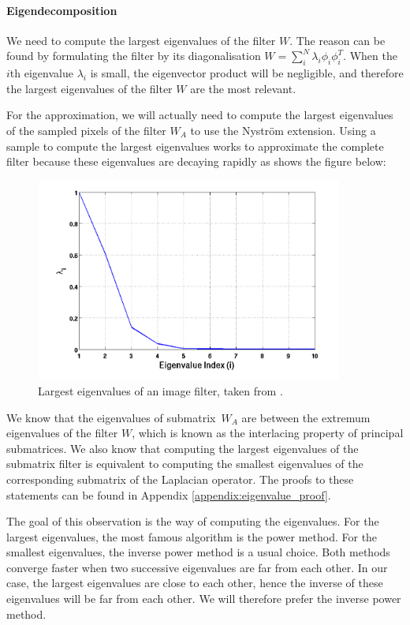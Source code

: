 \paragraph{Eigendecomposition}
We need to compute the largest eigenvalues of the filter \(W\).
The reason can be found by formulating the filter by its diagonalisation \(W = \sum_i^N \lambda_i \phi_i \phi_i^T\).
When the \(i\)th eigenvalue \(\lambda_i\) is small, the eigenvector product will be negligible, and therefore the largest eigenvalues of the filter \(W\) are the most relevant.

For the approximation, we will actually need to compute the largest eigenvalues of the sampled pixels of the filter \(W_A\) to use the Nystr\"om extension.
Using a sample to compute the largest eigenvalues works to approximate the complete filter because these eigenvalues are decaying rapidly as shows the figure below:
\begin{figure}[H]
  \centering
  \includegraphics[width=0.9\textwidth]{img/decayingEigenvalues.png}
  \caption{Largest eigenvalues of an image filter, taken from \cite{siam_slides_2016}.}
\end{figure}

We know that the eigenvalues of submatrix\ \(W_A\) are between the extremum eigenvalues of the filter \(W\), which is known as the interlacing property of principal submatrices.
We also know that computing the largest eigenvalues of the submatrix filter is equivalent to computing the smallest eigenvalues of the corresponding submatrix of the Laplacian operator.
The proofs to these statements can be found in Appendix \ref{appendix:eigenvalue_proof}.

The goal of this observation is the way of computing the eigenvalues.
For the largest eigenvalues, the most famous algorithm is the power method.
For the smallest eigenvalues, the inverse power method is a usual choice.
Both methods converge faster when two successive eigenvalues are far from each other.
In our case, the largest eigenvalues are close to each other, hence the inverse of these eigenvalues will be far from each other.
We will therefore prefer the inverse power method.

